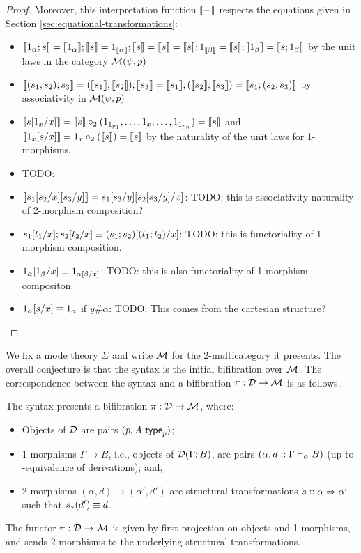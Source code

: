 \begin{proof}
Moreover, this interpretation function $\llbracket - \rrbracket$ respects the equations given in Section \ref{sec:equational-transformations}:
\begin{itemize}
\item $\llbracket 1_\alpha ; s \rrbracket  = \llbracket 1_\alpha \rrbracket; \llbracket s \rrbracket = 1_{\llbracket \alpha \rrbracket} ; \llbracket s \rrbracket = \llbracket s \rrbracket = \llbracket s \rrbracket ; 1_{\llbracket \beta \rrbracket} = \llbracket s \rrbracket ; \llbracket 1_\beta\rrbracket = \llbracket s ; 1_\beta\rrbracket$ by the unit laws in the category $\mathcal{M}(\psi, p)$
\item $\llbracket (s_1;s_2);s_3 \rrbracket = (\llbracket s_1 \rrbracket ; \llbracket s_2 \rrbracket ); \llbracket s_3 \rrbracket = \llbracket s_1 \rrbracket ; (\llbracket s_2 \rrbracket ; \llbracket s_3 \rrbracket) = \llbracket s_1;(s_2;s_3) \rrbracket$ by associativity in $\mathcal{M}(\psi, p)$
\item $\llbracket s[1_x/x] \rrbracket = \llbracket s \rrbracket \mathbin{\circ_2} (1_{1_{p_1}}, \dots, {1_x}, \dots, 1_{1_{p_n}}) = \llbracket s \rrbracket$ and $\llbracket 1_x[s/x] \rrbracket = 1_x \mathbin{\circ_2} (\llbracket s \rrbracket) = \llbracket s \rrbracket$ by the naturality of the unit laws for 1-morphisms.
\item TODO:
\item $\llbracket s_1[s_2/x][s_3/y] \rrbracket = 
s_1[s_3/y][s_2[s_3/y]/x]$: TODO: this is associativity naturality of 2-morphism composition?
\item $s_1[t_1/x];s_2[t_2/x] \equiv (s_1;s_2)[(t_1;t_2)/x]$: TODO: this is functoriality of 1-morphism composition.
\item $1_\alpha[1_\beta/x] \equiv 1_{\alpha[\beta/x]}$: TODO: this is also functoriality of 1-morphism compositon.
\item $1_\alpha[s/x] \equiv 1_\alpha$ if $y \# \alpha$: TODO: This comes from the cartesian structure?
\end{itemize}
\end{proof}

We fix a mode theory $\Sigma$ and write $\mathcal{M}$ for the 2-multicategory it presents. The overall conjecture is that the syntax is the initial bifibration
over $\mathcal{M}$.  The correspondence between the syntax and a bifibration $\pi
: \mathcal{D} \to \mathcal{M}$ is as follows.

\begin{theorem}
The syntax presents a bifibration $\pi : \mathcal{D} \to \mathcal{M}$, where:
\begin{itemize}
\item Objects of $\mathcal{D}$ are pairs $(p, A \,\, \mathsf{type}_{p})$;
\item 1-morphisms $\Gamma \to B$, i.e., objects of $\mathcal{D}(\Gamma; B)$, are pairs $(\alpha, d :: \Gamma \vdash_{\alpha} B)$ (up to \deq-equivalence of derivations); and,
\item 2-morphisms $(\alpha, d) \to (\alpha', d')$ are structural transformations $s :: \alpha \Rightarrow \alpha'$ such that $s_*(d') \equiv d$.
\end{itemize}
The functor $\pi : \mathcal{D} \to \mathcal{M}$ is given by first projection on objects and 1-morphisms, and sends 2-morphisms to the underlying structural transformations.
\end{theorem}

